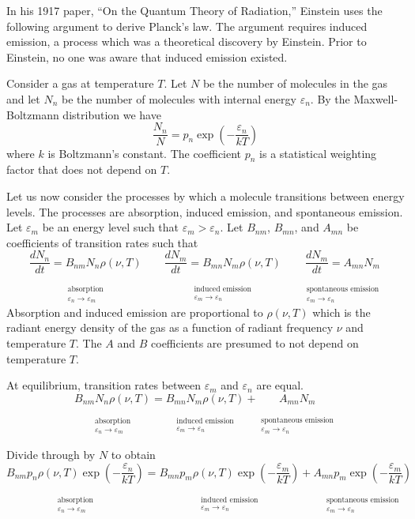 \documentclass[12pt]{article}
\newcommand\BNM{B_{nm}} %
\newcommand\BMN{B_{mn}} %
\newcommand\AMN{A_{mn}} %
\newcommand\RHO{\rho(\nu,T)}
\newcommand\ABSORPTION{\substack{\phantom{0}\\ \text{absorption}\\ \varepsilon_n\rightarrow\varepsilon_m}}
\newcommand\INDUCED{\substack{\phantom{0}\\ \text{induced emission}\\ \varepsilon_m\rightarrow\varepsilon_n}}
\newcommand\SPONTANEOUS{\substack{\phantom{0}\\ \text{spontaneous emission}\\ \varepsilon_m\rightarrow\varepsilon_n}}
\begin{document}
\noindent
In his 1917 paper, ``On the Quantum Theory of Radiation,''
Einstein uses the following argument to derive Planck's law.
The argument requires induced emission, a process which was a theoretical discovery by Einstein.
Prior to Einstein, no one was aware that induced emission existed.

\bigskip
\noindent
Consider a gas at temperature $T$.
Let $N$ be the number of molecules in the gas
and let $N_n$ be the number of molecules with internal energy $\varepsilon_n$.
By the Maxwell-Boltzmann distribution we have
\begin{equation*}
\frac{N_n}{N}=p_n\exp\left(-\frac{\varepsilon_n}{kT}\right)
\end{equation*}
where $k$ is Boltzmann's constant.
The coefficient $p_n$ is a statistical weighting factor that does not depend on $T$.

\bigskip
\noindent
Let us now consider the processes by which a molecule transitions between energy levels.
The processes are absorption, induced emission, and spontaneous emission.
Let $\varepsilon_m$ be an energy level such that $\varepsilon_m>\varepsilon_n$.
Let $\BNM$, $\BMN$, and $\AMN$ be coefficients of transition rates such that
\begin{equation*}
\underset{\ABSORPTION}{\frac{dN_n}{dt}=\BNM N_n \RHO}
\qquad
\underset{\INDUCED}{\frac{dN_m}{dt}=\BMN N_m \RHO}
\qquad
\underset{\SPONTANEOUS}{\frac{dN_m}{dt}=\AMN N_m}
\end{equation*}
Absorption and induced emission are proportional to $\RHO$
which is the radiant energy density of the gas
as a function of radiant frequency $\nu$ and temperature $T$.
The $A$ and $B$ coefficients are presumed to not depend on temperature $T$.

\bigskip
\noindent
At equilibrium, transition rates between $\varepsilon_m$ and $\varepsilon_n$ are equal.
\begin{equation*}
\underset{\ABSORPTION}{\BNM N_n \RHO}
=\underset{\INDUCED}{\BMN N_m \RHO}
+\underset{\SPONTANEOUS}{\AMN N_m}
\end{equation*}

\noindent
Divide through by $N$ to obtain
\begin{equation*}
\underset{\ABSORPTION}{\BNM p_n \RHO\exp\left(-\frac{\varepsilon_n}{kT}\right)}
=\underset{\INDUCED}{\BMN p_m \RHO\exp\left(-\frac{\varepsilon_m}{kT}\right)}
+\underset{\SPONTANEOUS}{\AMN p_m\exp\left(-\frac{\varepsilon_m}{kT}\right)}
\end{equation*}
\end{document}
